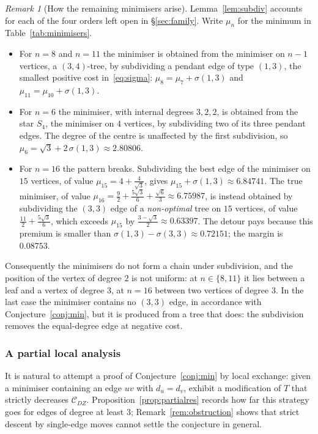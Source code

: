 \documentclass[11pt,a4paper]{article}
\theoremstyle{plain}
\theoremstyle{definition}
\theoremstyle{remark}
\newtheorem{remark}[theorem]{Remark}
\newcommand{\CDZ}{\mathcal{C}_{DZ}}
\begin{document}
\begin{remark}[How the remaining minimisers arise]
\label{rem:structure}
Lemma~\ref{lem:subdiv} accounts for each of the four orders left open in
\S\ref{sec:family}. Write $\mu_n$ for the minimum in Table~\ref{tab:minimisers}.
\begin{itemize}
\item For $n=8$ and $n=11$ the minimiser is obtained from the minimiser on
      $n-1$ vertices, a $(3,4)$-tree, by subdividing a pendant edge of type
      $(1,3)$, the smallest positive cost in~\eqref{eq:sigma}:
      $\mu_8=\mu_7+\sigma(1,3)$ and $\mu_{11}=\mu_{10}+\sigma(1,3)$.
\item For $n=6$ the minimiser, with internal degrees $3,2,2$, is obtained from
      the star $S_4$, the minimiser on $4$ vertices, by subdividing two of its
      three pendant edges. The degree of the centre is unaffected by the first
      subdivision, so $\mu_6=\sqrt3+2\,\sigma(1,3)\approx2.80806$.
\item For $n=16$ the pattern breaks. Subdividing the best edge of the minimiser
      on $15$ vertices, of value $\mu_{15}=4+\tfrac{4}{\sqrt3}$, gives
      $\mu_{15}+\sigma(1,3)\approx6.84741$. The true minimiser, of value
      $\mu_{16}=\tfrac92+\tfrac{5\sqrt3}{6}+\tfrac{\sqrt6}{3}\approx6.75987$, is
      instead obtained by subdividing the $(3,3)$ edge of a \emph{non-optimal}
      tree on $15$ vertices, of value $\tfrac{11}{2}+\tfrac{5\sqrt3}{6}$, which
      exceeds $\mu_{15}$ by $\tfrac{3-\sqrt3}{2}\approx0.63397$. The detour pays
      because this premium is smaller than $\sigma(1,3)-\sigma(3,3)\approx0.72151$;
      the margin is $0.08753$.
\end{itemize}
Consequently the minimisers do not form a chain under subdivision, and the
position of the vertex of degree $2$ is not uniform: at $n\in\{8,11\}$ it lies
between a leaf and a vertex of degree $3$, at $n=16$ between two vertices of
degree $3$. In the last case the minimiser contains no $(3,3)$ edge, in
accordance with Conjecture~\ref{conj:min}, but it is produced from a tree that
does: the subdivision removes the equal-degree edge at negative cost.
\end{remark}

\subsubsection{A partial local analysis}
\label{sec:local}

It is natural to attempt a proof of Conjecture~\ref{conj:min} by local exchange:
given a minimiser containing an edge $uv$ with $d_u=d_v$, exhibit a modification
of $T$ that strictly decreases $\CDZ$. Proposition~\ref{prop:partialres} records
how far this strategy goes for edges of degree at least $3$;
Remark~\ref{rem:obstruction} shows that strict descent by single-edge moves
cannot settle the conjecture in general.
\end{document}
